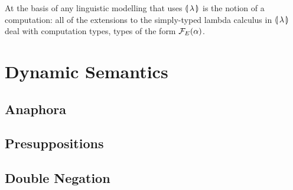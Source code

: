 At the basis of any linguistic modelling that uses $\llparenthesis \, \lambda \, \rrparenthesis$ is
the notion of a computation: all of the extensions to the simply-typed
lambda calculus in $\llparenthesis \, \lambda \, \rrparenthesis$ deal with computation types, types of
the form $\mathcal{F}_E(\alpha)$.


\section{Dynamic Semantics}


\subsection{Anaphora}


\subsection{Presuppositions}


\subsection{Double Negation}


